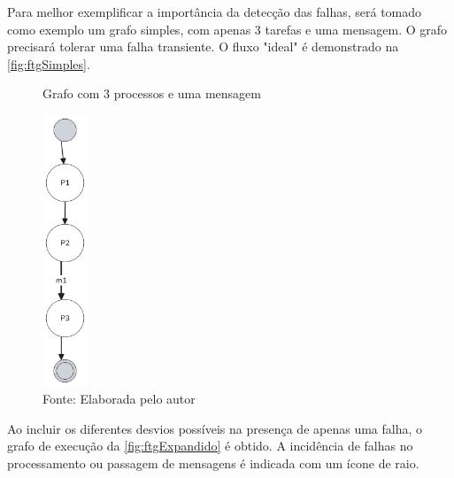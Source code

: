 Para melhor exemplificar a importância da detecção das falhas, será tomado como exemplo um grafo simples, com apenas 3 tarefas e uma mensagem. O grafo precisará tolerar uma falha transiente. O fluxo "ideal" é demonstrado na \autoref{fig:ftgSimples}.

\begin{figure}[H]
    \centering
    \captionsetup{justification=centering}
    \caption{Grafo com 3 processos e uma mensagem}
    \includegraphics[width=0.120\textwidth]{assets/ftg_simples.png}
    \captionsetup{justification=raggedright}
    \caption*{Fonte: Elaborada pelo autor}
    \label{fig:ftgSimples}
\end{figure}

Ao incluir os diferentes desvios possíveis na presença de apenas uma falha, o grafo de execução da \autoref{fig:ftgExpandido} é obtido. A incidência de falhas no processamento ou passagem de mensagens é indicada com um ícone de raio.

